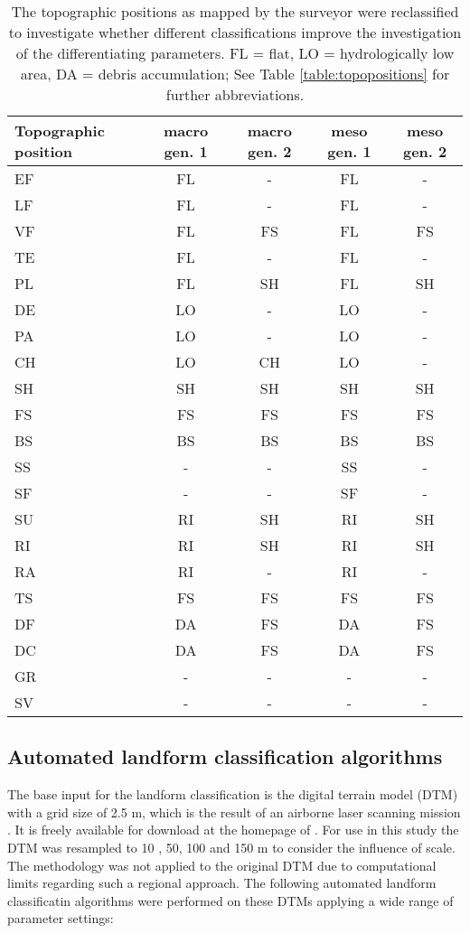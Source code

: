 \documentclass[preprint,12pt,authoryear]{elsarticle}
\begin{document}
\begin{table}[!htbp]
\caption{The topographic positions as mapped by the surveyor were reclassified to investigate whether different classifications improve the investigation of the differentiating parameters. FL = flat, LO = hydrologically low area, DA = debris accumulation; See Table \ref{table:topopositions} for further abbreviations. }
\begin{center}
    \begin{tabular}{  p{2.5cm} c  c  c  c }
	\hline\hline
	Topographic position & macro gen. 1 & macro gen. 2 & meso gen. 1 & meso gen. 2 \\ \hline
	EF & FL & - & FL & -\\ 
	LF & FL & - & FL & -  \\ 
	VF & FL & FS & FL & FS \\ 
	TE & FL & - & FL & - \\ 
	PL & FL & SH & FL & SH \\ 
	DE & LO & - & LO & - \\ 
	PA & LO & - & LO & - \\ 
	CH & LO & CH & LO & - \\ 
	SH & SH & SH & SH & SH \\ 
	FS & FS & FS & FS & FS \\ 
	BS & BS & BS & BS & BS \\ 
	SS & - & - & SS & - \\ 
	SF & - & - & SF & - \\ 
 	SU & RI & SH & RI & SH \\ 
	RI & RI & SH & RI & SH \\ 
	RA & RI & - & RI &	- \\ 
	TS & FS & FS & FS & FS \\ 
	DF & DA & FS & DA & FS \\ 
	DC & DA & FS & DA & FS \\
	GR & - & - & - & - \\
	SV & - & - & - & - \\ 
    \end{tabular}
    \label{table:generalisations}
\end{center}
\end{table}
 

\subsection{Automated landform classification algorithms}
The base input for the landform classification is the digital terrain model (DTM) with a grid size of 2.5 m, which is the result of an airborne laser scanning mission \citep{Wack2005}. It is freely available for download at the homepage of \cite{DTM}. For use in this study the DTM was resampled to 10 , 50, 100 and 150 m to consider the influence of scale. The methodology was not applied to the original DTM due to computational limits regarding such a regional approach. The following automated landform classificatin algorithms were performed on these DTMs applying a wide range of parameter settings:
\end{document}
